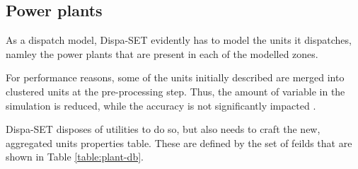 \subsection{Power plants}

As a dispatch model, Dispa-SET evidently has to model the units it dispatches, namley the power plants that are present in each of the modelled zones.

For performance reasons, some of the units initially described are merged into clustered units at the pre-processing step. Thus, the amount of variable in the simulation is reduced, while the accuracy is not significantly impacted \cite{dispaset}.

Dispa-SET disposes of utilities to do so, but also needs to craft the new, aggregated units properties table. These are defined by the set of feilds that are shown in Table \ref{table:plant-db}.

